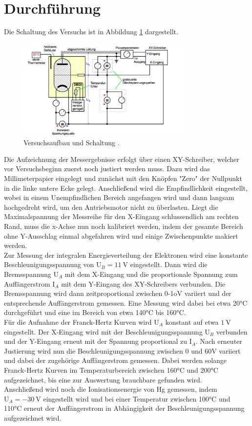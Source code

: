\section{Durchführung}
Die Schaltung des Versuchs ist in Abbildung \ref{fig:Schaltung} dargestellt.
\begin{figure}[H]
  \centering
  \includegraphics[height=5cm]{Schaltung.png}
  \caption{Versuchsaufbau und Schaltung \cite{skript}.}
  \label{fig:Schaltung}
\end{figure}
Die Aufzeichnung der Messergebnisse erfolgt über einen XY-Schreiber, welcher vor
Versuchsbeginn zuerst noch justiert werden muss. Dazu wird das Millimeterpapier eingelegt
und zunächst mit den Knöpfen "Zero" der Nullpunkt in die linke untere Ecke gelegt.
Anschließend wird die Empfindlichkeit eingestellt, wobei in einem Unempfindlichen Bereich
angefangen wird und dann langsam hochgedreht wird, um den Antriebsmotor nicht zu überlasten.
Liegt die Maximalspannung der Messreihe für den X-Eingang schlussendlich am rechten Rand,
muss die x-Achse nun noch kalibriert werden, indem der gesamte Bereich ohne Y-Ausschlag einmal
abgefahren wird und einige Zwischenpunkte makiert werden. \\
Zur Messung der integralen Energieverteilung der Elektronen wird eine konstante
Beschleunigungsspannung von $\text{U}_B = \SI{11}{\volt}$ eingestellt. Dann wird die
Bremsspannung $\text{U}_A$ mit dem X-Eingang und die proportionale Spannung zum Auffängerstrom $\text{I}_A$
mit dem Y-Eingang des XY-Schreibers verbunden. Die Bremsspannung wird dann zeitproportional
zwischen 0-1o$\si{\volt}$ variiert und der entsprechende Auffängerstrom gemessen.
Eine Messung wird dabei bei etwa 20°C durchgeführt und eine im Bereich von etwa
140°C bis 160°C. \\
Für die Aufnahme der Franck-Hertz Kurven wird $\text{U}_A$ konstant auf etwa $\SI{1}{\volt}$
eingestellt. Der X-Eingang wird mit der Beschleunigungsspannung $\text{U}_B$ verbunden
und der Y-Eingang erneut mit der Spannung proportional zu $\text{I}_A$. Nach erneuter
Justierung wird nun die Beschleunigungsspannung zwischen 0 und 60$\si{\volt}$ variiert und dabei
der zugehörige Auffängerstrom gemessen. Dabei werden solange Franck-Hertz
Kurven im Temperaturbereich zwischen 160°C und 200°C aufgezeichnet, bis eine zur
Auswertung brauchbare gefunden wird. \\
Anschließend wird noch die Ionisationsenergie von Hg gemessen, indem $\text{U}_A = - \SI{30}{\volt}$ eingestellt
wird und bei einer Temperatur zwischen 100°C und 110°C erneut der Auffängerstrom in Abhängigkeit
der Beschleunigungsspannung aufgezeichnet wird.
